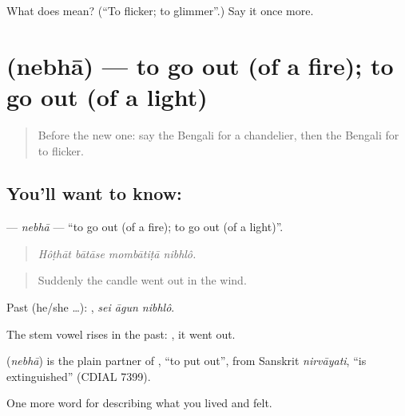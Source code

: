 \begin{tcolorbox}[breakable,colback=teal!4,colframe=teal!35!black,title={Before you move on}]
What does   mean? (\textquotedblleft{}To flicker; to glimmer\textquotedblright{}.) Say it once more.
\end{tcolorbox}
\section[\texorpdfstring{\bn{নেভা} (nebhā)}{নেভা (nebhā)}]{ (nebhā) — to go out (of a fire); to go out (of a light)}

\label{lesson:BN-C505-nebha}



\begin{quote}
Before the new one: say the Bengali for a chandelier, then the Bengali for to flicker.
\end{quote}

\subsection*{You'll want to know: }
\textbf{} — \emph{nebhā} — \textquotedblleft{}to go out (of a fire); to go out (of a light)\textquotedblright{}.

\begin{quote}
   
\end{quote}

\begin{quote}
\emph{Hôṭhāt bātāse mombātiṭā nibhlô.}
\end{quote}

\begin{quote}
Suddenly the candle went out in the wind.
\end{quote}

Past (he/she …):   , \emph{sei āgun nibhlô}.

The stem vowel rises in the past: , it went out.

\begin{cousinweb}
\textbf{} (\emph{nebhā}) is the plain partner of , \textquotedblleft{}to put out\textquotedblright{}, from Sanskrit \emph{nirvāyati}, \textquotedblleft{}is extinguished\textquotedblright{} (CDIAL 7399).
\end{cousinweb}

\begin{grammarlens}[title={What you've built}]
One more word for describing what you lived and felt.
\end{grammarlens}

